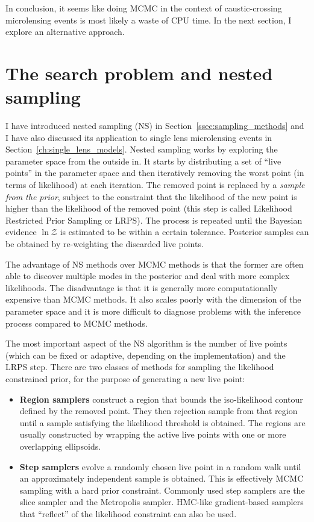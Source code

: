 \documentclass[12pt,dvipsnames]{report}
\begin{document}
In conclusion, it seems like doing MCMC in the context of caustic-crossing 
microlensing events is most likely a waste of CPU time. 
In the next section, I explore an alternative approach.

\section{The search problem and nested sampling}
\label{sec:binary_lens_ns}
I have introduced nested sampling (NS) in Section~\ref{ssec:sampling_methods} and I have 
also discussed its application to single lens microlensing events in
Section~\ref{ch:single_lens_models}. Nested sampling works by exploring the parameter space 
from the outside in. It starts by distributing a set of ``live points'' in the 
parameter space and then iteratively removing the worst point (in terms of likelihood)
at each iteration. The removed point is replaced by a \emph{sample from the prior}, 
subject to the constraint that the likelihood of the new point is higher than the 
likelihood of the removed point (this step is called Likelihood Restricted Prior 
Sampling or LRPS).
The process is repeated until the Bayesian evidence 
$\ln\mathcal{Z}$ is estimated to be within a certain tolerance. Posterior samples can be 
obtained by re-weighting the discarded live points. 

The advantage of NS methods 
over MCMC methods is that the former are often able to discover multiple modes in the 
posterior and deal with more complex likelihoods. The disadvantage is that it is generally
more computationally expensive than MCMC methods. 
It also scales poorly with the dimension of 
the parameter space and it is more difficult to diagnose problems with the inference process
compared to MCMC methods.

The most important aspect of the NS algorithm is the number of live points (which can be fixed
or adaptive, depending on the implementation) and the LRPS step. There are two classes of methods 
for sampling the likelihood constrained prior, for the purpose of generating a new live point:
\begin{itemize}
    \item \textbf{Region samplers} construct a region that bounds the iso-likelihood contour 
    defined by the removed point. They then rejection sample from that region until a sample 
    satisfying the likelihood threshold is obtained. The regions are usually constructed 
    by wrapping the active live points with one or more overlapping ellipsoids. 
    \item \textbf{Step samplers} evolve a randomly chosen live point in a random walk 
    until an approximately independent sample is obtained. This is effectively MCMC 
    sampling with a hard prior constraint. Commonly used step samplers are the slice sampler
    and the Metropolis sampler. HMC-like gradient-based samplers that 
    ``reflect'' of the likelihood constraint can also be used.
\end{itemize}
\end{document}
